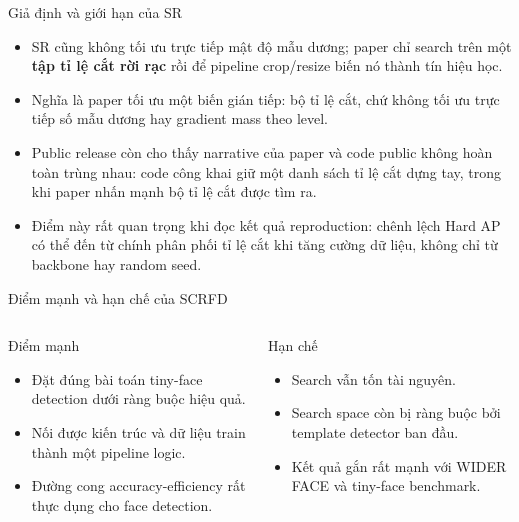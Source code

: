 \documentclass[aspectratio=169,11pt]{beamer}
\begin{document}
\begin{frame}{Giả định và giới hạn của SR}
  \begin{itemize}
    \item SR cũng không tối ưu trực tiếp mật độ mẫu dương; paper chỉ search trên một \textbf{tập tỉ lệ cắt rời rạc} rồi để pipeline crop/resize biến nó thành tín hiệu học.
    \item Nghĩa là paper tối ưu một biến gián tiếp: bộ tỉ lệ cắt, chứ không tối ưu trực tiếp số mẫu dương hay gradient mass theo level.
    \item Public release còn cho thấy narrative của paper và code public không hoàn toàn trùng nhau: code công khai giữ một danh sách tỉ lệ cắt dựng tay, trong khi paper nhấn mạnh bộ tỉ lệ cắt được tìm ra.
    \item Điểm này rất quan trọng khi đọc kết quả reproduction: chênh lệch Hard AP có thể đến từ chính phân phối tỉ lệ cắt khi tăng cường dữ liệu, không chỉ từ backbone hay random seed.
  \end{itemize}
\end{frame}

\begin{frame}{Điểm mạnh và hạn chế của SCRFD}
  \begin{columns}[T,onlytextwidth]
    \begin{block}{Điểm mạnh}
      \begin{itemize}
        \item Đặt đúng bài toán tiny-face detection dưới ràng buộc hiệu quả.
        \item Nối được kiến trúc và dữ liệu train thành một pipeline logic.
        \item Đường cong accuracy-efficiency rất thực dụng cho face detection.
      \end{itemize}
    \end{block}
    \begin{block}{Hạn chế}
      \begin{itemize}
        \item Search vẫn tốn tài nguyên.
        \item Search space còn bị ràng buộc bởi template detector ban đầu.
        \item Kết quả gắn rất mạnh với WIDER FACE và tiny-face benchmark.
      \end{itemize}
    \end{block}
  \end{columns}
\end{frame}
\end{document}

